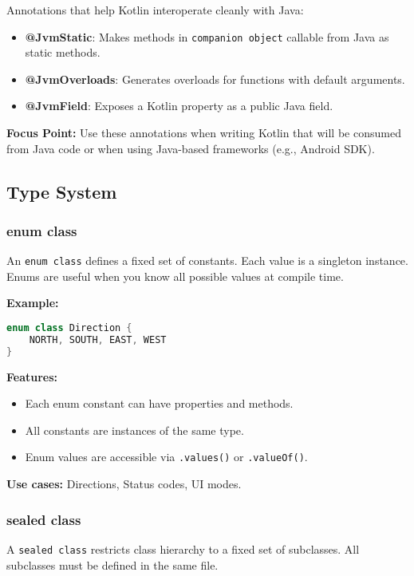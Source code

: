 \documentclass[a4paper,12pt]{article}
\begin{document}
Annotations that help Kotlin interoperate cleanly with Java:

\begin{itemize}
  \item \textbf{@JvmStatic}: Makes methods in \texttt{companion object} callable from Java as static methods.
  \item \textbf{@JvmOverloads}: Generates overloads for functions with default arguments.
  \item \textbf{@JvmField}: Exposes a Kotlin property as a public Java field.
\end{itemize}

\textbf{Focus Point:} Use these annotations when writing Kotlin that will be consumed from Java code or when using Java-based frameworks (e.g., Android SDK).


\subsection{Type System}

\subsubsection{enum class}

An \texttt{enum class} defines a fixed set of constants. Each value is a singleton instance. Enums are useful when you know all possible values at compile time.

\textbf{Example:}
\begin{lstlisting}[language=Kotlin]
enum class Direction {
    NORTH, SOUTH, EAST, WEST
}
\end{lstlisting}

\textbf{Features:}
\begin{itemize}
  \item Each enum constant can have properties and methods.
  \item All constants are instances of the same type.
  \item Enum values are accessible via \texttt{.values()} or \texttt{.valueOf()}.
\end{itemize}

\textbf{Use cases:} Directions, Status codes, UI modes.

\subsubsection{sealed class}

A \texttt{sealed class} restricts class hierarchy to a fixed set of subclasses. All subclasses must be defined in the same file.
\end{document}
